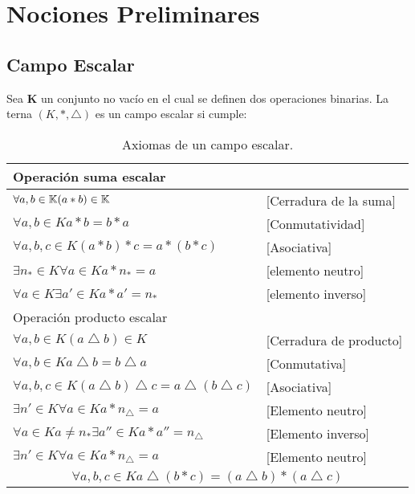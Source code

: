 \chapter{Nociones Preliminares}

\section{Campo Escalar}
Sea $\mathbf{K}$ un conjunto no vac\'io en el cual se definen dos operaciones binarias. La terna $\left( K,\ast,\bigtriangleup \right)$ es un campo escalar si cumple: 



\begin{table}[htbp]
\begin{center}
\begin{tabular}{|l|l|}
\hline
\multicolumn{2}{|l|}{Operación suma escalar } \\
\hline \hline
$\forall a,b\in \mathbb{K} (a*b)\in \mathbb{K} $ &[Cerradura de la suma] \\ \hline
$ \forall  a,b\in K a*b=b*a $&[Conmutatividad]  \\ \hline
$\forall  a,b,c\in K (a*b)*c=a*(b*c)$&[Asociativa] \\ 
\hline
$\exists n_*\in K \forall  a\in K a*n_*=a$&  [elemento neutro]  \\ \hline
$\forall  a\in K \exists a'\in K a*a'=n_*$&  [elemento inverso]  \\ \hline
Operación producto escalar &\\ \hline \hline
 $\forall  a,b\in K (a\bigtriangleup b)\in K $& [Cerradura de producto] \\ \hline
$\forall  a,b\in K a\bigtriangleup b=b\bigtriangleup a$&  [Conmutativa]  \\ \hline
$\forall  a,b,c\in K (a\bigtriangleup b)\bigtriangleup c=a\bigtriangleup (b\bigtriangleup c) $&  [Asociativa]  \\ \hline
$\exists n'\in K \forall  a\in K  a*n_\bigtriangleup =a $&  [Elemento neutro]  \\ \hline
$\forall  a\in K a\neq n_*  \exists a''\in K a*a''=n_\bigtriangleup  $&  [Elemento inverso]  \\ \hline
$\exists n'\in K \forall  a\in K  a*n_\bigtriangleup =a $&  [Elemento neutro]  \\ \hline
\multicolumn{2}{|c|}{$\forall a,b,c\in K  a\bigtriangleup (b*c)=(a\bigtriangleup b)*(a\bigtriangleup c)
 $ } \\ \hline
\end{tabular}
\caption{Axiomas de un campo escalar.}
\label{tabla:sencilla}
\end{center}
\end{table}


